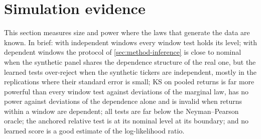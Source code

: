 \section{Simulation evidence}\label{sec:sim}

This section measures size and power where the laws that generate the data are known. In brief:
with independent windows every window test holds its level; with dependent windows the protocol of
\cref{sec:method-inference} is close to nominal when the synthetic panel shares the dependence
structure of the real one, but the learned tests over-reject when the synthetic tickers are
independent, mostly in the replications where their standard error is small; KS on pooled returns
is far more powerful than every window test against deviations of the marginal law, has no power
against deviations of the dependence alone and is invalid when returns within a window are
dependent; all tests are far below the Neyman--Pearson oracle; the anchored relative test is at
its nominal level at its boundary; and no learned score is a good estimate of the log-likelihood
ratio.

